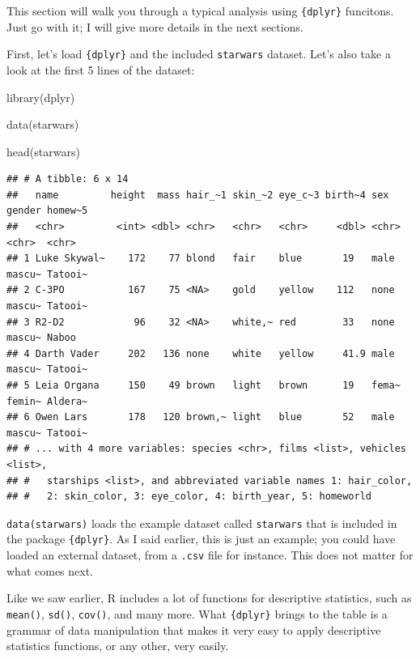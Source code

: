 \documentclass[
]{article}
\newenvironment{Shaded}{\begin{snugshade}}{\end{snugshade}}
\newcommand{\FunctionTok}[1]{\textcolor[rgb]{0.00,0.00,0.00}{#1}}
\newcommand{\NormalTok}[1]{#1}
\begin{document}
This section will walk you through a typical analysis using \texttt{\{dplyr\}} funcitons. Just go with it; I
will give more details in the next sections.

First, let's load \texttt{\{dplyr\}} and the included \texttt{starwars} dataset. Let's also take a look at the
first 5 lines of the dataset:

\begin{Shaded}
\begin{Highlighting}[]
\FunctionTok{library}\NormalTok{(dplyr)}

\FunctionTok{data}\NormalTok{(starwars)}

\FunctionTok{head}\NormalTok{(starwars)}
\end{Highlighting}
\end{Shaded}

\begin{verbatim}
## # A tibble: 6 x 14
##   name         height  mass hair_~1 skin_~2 eye_c~3 birth~4 sex   gender homew~5
##   <chr>         <int> <dbl> <chr>   <chr>   <chr>     <dbl> <chr> <chr>  <chr>  
## 1 Luke Skywal~    172    77 blond   fair    blue       19   male  mascu~ Tatooi~
## 2 C-3PO           167    75 <NA>    gold    yellow    112   none  mascu~ Tatooi~
## 3 R2-D2            96    32 <NA>    white,~ red        33   none  mascu~ Naboo  
## 4 Darth Vader     202   136 none    white   yellow     41.9 male  mascu~ Tatooi~
## 5 Leia Organa     150    49 brown   light   brown      19   fema~ femin~ Aldera~
## 6 Owen Lars       178   120 brown,~ light   blue       52   male  mascu~ Tatooi~
## # ... with 4 more variables: species <chr>, films <list>, vehicles <list>,
## #   starships <list>, and abbreviated variable names 1: hair_color,
## #   2: skin_color, 3: eye_color, 4: birth_year, 5: homeworld
\end{verbatim}

\texttt{data(starwars)} loads the example dataset called \texttt{starwars} that is included in the package
\texttt{\{dplyr\}}. As I said earlier, this is just an example; you could have loaded an external dataset,
from a \texttt{.csv} file for instance. This does not matter for what comes next.

Like we saw earlier, R includes a lot of functions for descriptive statistics, such as \texttt{mean()},
\texttt{sd()}, \texttt{cov()}, and many more. What \texttt{\{dplyr\}} brings to the table is a grammar of data
manipulation that makes it very easy to apply descriptive statistics functions, or any other,
very easily.
\end{document}
